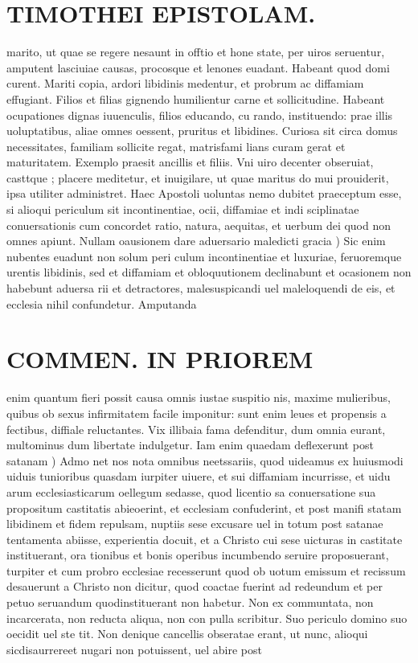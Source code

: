\documentclass{article}
\begin{document}
\begin{pages}
\section*{TIMOTHEI EPISTOLAM. }
\marginpar{[ p.133 ]}\pstart marito, ut quae se regere nesaunt in offtio et hone state, per uiros seruentur, amputent lasciuiae causas, procosque et lenones euadant. Habeant quod domi curent. Mariti copia, ardori libidinis medentur, et probrum ac diffamiam effugiant. Filios et filias gignendo humilientur carne et sollicitudine. Habeant ocupationes dignas iuuenculis, filios educando, cu rando, instituendo: prae illis uoluptatibus, aliae omnes oessent, pruritus et libidines. Curiosa sit circa domus necessitates, familiam sollicite regat, matrisfami lians curam gerat et maturitatem. Exemplo praesit ancillis et filiis. Vni uiro decenter obseruiat, casttque ; placere meditetur, et inuigilare, ut quae maritus do mui prouiderit, ipsa utiliter administret. Haec Apostoli uoluntas nemo dubitet praeceptum esse, si alioqui periculum sit incontinentiae, ocii, diffamiae et indi sciplinatae conuersationis cum concordet ratio, natura, aequitas, et uerbum dei quod non omnes apiunt.  \pend\pstart Nullam oausionem dare aduersario maledicti gracia ) Sic enim nubentes euadunt non solum peri culum incontinentiae et luxuriae, feruoremque urentis libidinis, sed et diffamiam et obloquutionem declinabunt et ocasionem non habebunt aduersa rii et detractores, malesuspicandi uel maleloquendi de eis, et ecclesia nihil confundetur. Amputanda  \pend
\section*{COMMEN. IN PRIOREM }
\marginpar{[ p.134 ]}\pstart enim quantum fieri possit causa omnis iustae suspitio nis, maxime mulieribus, quibus ob sexus infirmitatem facile imponitur: sunt enim leues et propensis a fectibus, diffiale reluctantes. Vix illibaia fama defenditur, dum omnia eurant, multominus dum libertate indulgetur.  \pend\pstart Iam enim quaedam deflexerunt post satanam ) Admo net nos nota omnibus neetssariis, quod uideamus ex huiusmodi uiduis tunioribus quasdam iurpiter uiuere, et sui diffamiam incurrisse, et uidu arum ecclesiasticarum oellegum sedasse, quod licentio sa conuersatione sua propositum castitatis abieoerint, et ecclesiam confuderint, et post manifi statam libidinem et fidem repulsam, nuptiis sese excusare uel in totum post satanae tentamenta abiisse, experientia docuit, et a Christo cui sese uicturas in castitate instituerant, ora tionibus et bonis operibus incumbendo seruire proposuerant, turpiter et cum probro ecclesiae recesserunt quod ob uotum emissum et recissum desauerunt a Christo non dicitur, quod coactae fuerint ad redeundum et per petuo seruandum quodinstituerant non habetur. Non ex communtata, non incarcerata, non reducta aliqua, non con pulla scribitur. Suo periculo domino suo oecidit uel ste tit. Non denique cancellis obseratae erant, ut nunc, alioqui sicdisaurrereet nugari non potuissent, uel abire post  \pend

\end{pages}
\end{document}

